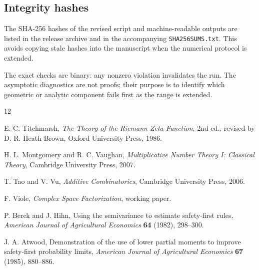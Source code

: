 \documentclass[11pt]{article}
\theoremstyle{definition}
\newcommand{\1}{\mathbf{1}}
\begin{document}
\subsection{Integrity hashes}

The SHA-256 hashes of the revised script and machine-readable outputs are listed in the release archive and in the accompanying \texttt{SHA256SUMS.txt}.  This avoids copying stale hashes into the manuscript when the numerical protocol is extended.

The exact checks are binary: any nonzero violation invalidates the run. The asymptotic diagnostics are not proofs; their purpose is to identify which geometric or analytic component fails first as the range is extended.

\begin{thebibliography}{12}

E. C. Titchmarsh,
\emph{The Theory of the Riemann Zeta-Function},
2nd ed., revised by D. R. Heath-Brown,
Oxford University Press, 1986.

H. L. Montgomery and R. C. Vaughan,
\emph{Multiplicative Number Theory I: Classical Theory},
Cambridge University Press, 2007.

T. Tao and V. Vu,
\emph{Additive Combinatorics},
Cambridge University Press, 2006.

F. Viole,
\emph{Complex Space Factorization},
working paper.

P. Berck and J. Hihn,
Using the semivariance to estimate safety-first rules,
\emph{American Journal of Agricultural Economics} \textbf{64} (1982), 298--300.

J. A. Atwood,
Demonstration of the use of lower partial moments to improve safety-first probability limits,
\emph{American Journal of Agricultural Economics} \textbf{67} (1985), 880--886.

\end{thebibliography}
\end{document}

